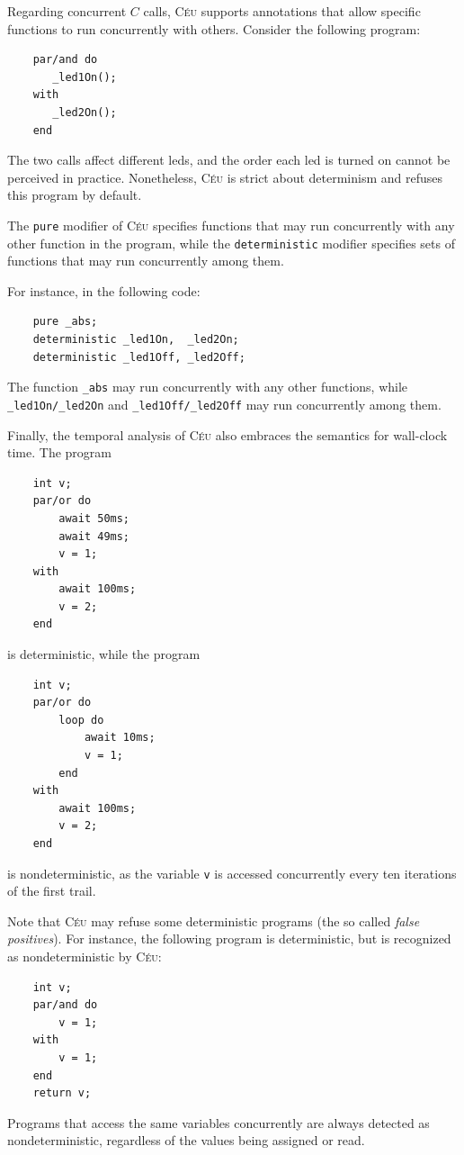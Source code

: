 \documentclass{sigplan-proc}
\newcommand{\2}{\;\;}
\newcommand{\5}{\;\;\;\;\;}
\newcommand{\CEU}{\textsc{C\'{e}u}}
\newcommand{\code}[1] {{\small{\texttt{#1}}}}
\begin{document}

Regarding concurrent $C$ calls, \CEU{} supports annotations that allow specific 
functions to run concurrently with others.
Consider the following program:
{\small
\begin{verbatim}
    par/and do
       _led1On();
    with
       _led2On();
    end
\end{verbatim}
}
The two calls affect different leds, and the order each led is turned on cannot 
be perceived in practice.
Nonetheless, \CEU{} is strict about determinism and refuses this program by 
default.

The \code{pure} modifier of \CEU{} specifies functions that may run 
concurrently with any other function in the program, while the 
\code{deterministic} modifier specifies sets of functions that may run 
concurrently among them.

For instance, in the following code:
{\small
\begin{verbatim}
    pure _abs;
    deterministic _led1On,  _led2On;
    deterministic _led1Off, _led2Off;
\end{verbatim}
}
The function \code{\_abs} may run concurrently with any other functions, while 
\code{\_led1On/\_led2On} and \code{\_led1Off/\_led2Off} may run concurrently 
among them.


Finally, the temporal analysis of \CEU{} also embraces the semantics for 
wall-clock time.
The program
{\small
\begin{verbatim}
    int v;
    par/or do
        await 50ms;
        await 49ms;
        v = 1;
    with
        await 100ms;
        v = 2;
    end
\end{verbatim}
}
is deterministic, while the program
{\small
\begin{verbatim}
    int v;
    par/or do
        loop do
            await 10ms;
            v = 1;
        end
    with
        await 100ms;
        v = 2;
    end
\end{verbatim}
}
is nondeterministic, as the variable \code{v} is accessed concurrently every 
ten iterations of the first trail.

Note that \CEU{} may refuse some deterministic programs (the so called 
\emph{false positives}).
For instance, the following program is deterministic, but is recognized as 
nondeterministic by \CEU:
{\small
\begin{verbatim}
    int v;
    par/and do
        v = 1;
    with
        v = 1;
    end
    return v;
\end{verbatim}
}
Programs that access the same variables concurrently are always detected as 
nondeterministic, regardless of the values being assigned or read.
\end{document}
